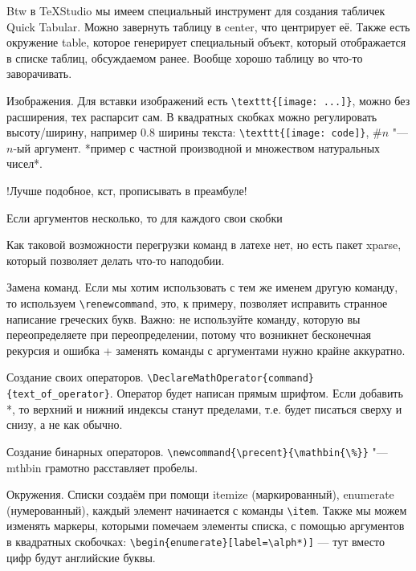 \documentclass[a4paper, 12pt]{article}
\begin{document}
Btw в TeXStudio мы имеем специальный инструмент для создания табличек Quick Tabular. Можно завернуть таблицу в center, что центрирует её. Также есть окружение table, которое генерирует специальный объект, который отображается в списке таблиц, обсуждаемом ранее. Вообще хорошо таблицу во что-то заворачивать.

Изображения. Для вставки изображений есть \verb|\texttt{[image: ...]}|, можно без расширения, тех распарсит сам. В квадратных скобках можно регулировать высоту/ширину, например $0.8$ ширины текста: \verb|\texttt{[image: code]}|, $\#n$ "--- $n$-ый аргумент. *пример с частной производной и множеством натуральных чисел*. 

!Лучше подобное, кст, прописывать в преамбуле!

Если аргументов несколько, то для каждого свои скобки

Как таковой возможности перегрузки команд в латехе нет, но есть пакет xparse, который позволяет делать что-то наподобии.

Замена команд. Если мы хотим использовать с тем же именем другую команду, то используем \verb|\renewcommand|, это, к примеру, позволяет исправить странное написание греческих букв. Важно: не используйте команду, которую вы переопределяете при переопределении, потому что возникнет бесконечная рекурсия и ошибка + заменять команды с аргументами нужно крайне аккуратно.

Создание своих операторов. \verb|\DeclareMathOperator{command}{text_of_operator}|. Оператор будет написан прямым шрифтом. Если добавить *, то верхний и нижний индексы станут пределами, т.е. будет писаться сверху и снизу, а не как обычно.

Создание бинарных операторов. \verb|\newcommand{\precent}{\mathbin{\%}}| "--- mthbin грамотно расставляет пробелы.

Окружения. Списки создаём при помощи itemize (маркированный), enumerate (нумерованный), каждый элемент начинается с команды \verb|\item|. Также мы можем изменять маркеры, которыми помечаем элементы списка, с помощью аргументов в квадратных скобочках: \verb|\begin{enumerate}[label=\alph*)]| --- тут вместо цифр будут английские буквы.
	
\end{document}
